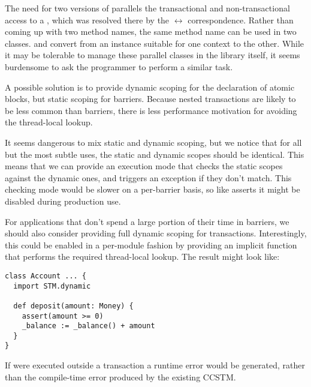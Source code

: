 The need for two versions of  parallels the transactional and
non-transactional access to a , which was resolved there by the
 $\leftrightarrow$  correspondence.  Rather than
coming up with two method names, the same method name can be used in
two classes.   and 
convert from an instance suitable for one context to the other.  While it
may be tolerable to manage these parallel classes in the library itself,
it seems burdensome to ask the programmer to perform a similar task.

A possible solution is to provide dynamic scoping for the declaration
of atomic blocks, but static scoping for barriers.  Because nested
transactions are likely to be less common than barriers, there is less
performance motivation for avoiding the thread-local lookup.

It seems dangerous to mix static and dynamic scoping, but we notice that
for all but the most subtle uses, the static and dynamic scopes should be
identical.  This means that we can provide an execution mode that checks
the
static scopes against the dynamic ones, and triggers an exception 
if they don't match.  This checking mode would be slower on a per-barrier
basis, so like asserts it might be disabled during production use.

For applications that don't spend a large portion of their time in barriers, we
should also consider providing full dynamic scoping for transactions.
Interestingly, this could be enabled in a per-module fashion by providing an
implicit function that performs the required thread-local lookup.  The result
might look like:
\lstset{numbers=none}
\begin{lstlisting}
class Account ... {
  import STM.dynamic

  def deposit(amount: Money) {
    assert(amount >= 0)
    _balance := _balance() + amount
  }
}
\end{lstlisting}
\lstset{numbers=left}
If  were executed outside a transaction a runtime error would be
generated, rather than the compile-time error produced by the existing CCSTM.
\color{black}
